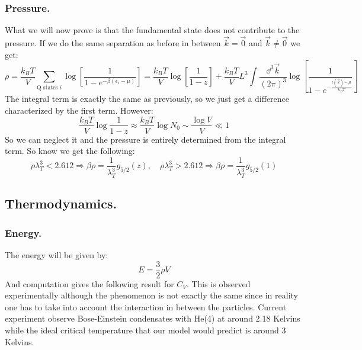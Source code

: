 \documentclass[10pt,a4paper]{book}
\begin{document}
\subsubsection{Pressure.}
What we will now prove is that the fundamental state does not contribute to the pressure. If we do the same separation as before in between $\vec{k} = \vec{0}$ and $\vec{k} \neq \vec{0}$ we get:
\[
\rho = \frac{k_B T}{V} \sum_{\text{Q states } i} \log[\frac{1}{1 - e^{-\beta(\epsilon_i - \mu)}}] = \frac{k_B T}{V} \log[\frac{1}{1 - z}] + \frac{k_B T}{V}L^3 \int \frac{\dd^3\vec{k}}{(2\pi)^3} \log[\frac{1}{1 - e^{-\frac{\epsilon(\vec{k}) - \mu}{k_B T}}}]
\]
The integral term is exactly the same as previously, so we just get a difference characterized by the first term. However:
\[
\frac{k_B T}{V} \log \frac{1}{1 - z} \approx \frac{k_B T}{V} \log N_0 \sim \frac{\log V}{V} \ll 1
\]
So we can neglect it and the pressure is entirely determined from the integral term. So know we get the following:
\[
\rho \lambda_T^3 < 2.612 \Rightarrow \beta \rho = \frac{1}{\lambda_T^3} g_{5/2}(z), \quad \rho \lambda_T^3
 > 2.612 \Rightarrow \beta \rho = \frac{1}{\lambda_T^3} g_{5/2}(1)\]
 
\subsection{Thermodynamics.}
\subsubsection{Energy.}
The energy will be given by:
\[
E = \frac{3}{2}\rho V
\]
And computation gives the following result for $C_V$. This is observed experimentally although the phenomenon is not exactly the same since in reality one has to take into account the interaction in between the particles. Current experiment observe Bose-Einstein condensates with He(4) at around 2.18 Kelvins while the ideal critical temperature that our model would predict is around 3 Kelvins. 
\end{document}
